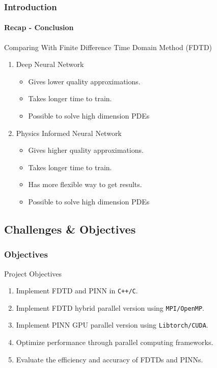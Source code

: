 \begin{frame}
  \frametitle{Introduction}
  \framesubtitle{Recap - Conclusion}
  \begin{block}{Comparing With Finite Difference Time Domain Method (FDTD)}
    \begin{enumerate}
      \item Deep Neural Network \cite{FIRST}
            \begin{itemize}
              \item Gives lower quality approximations.
              \item Takes longer time to train.
              \item Possible to solve high dimension PDEs \vspace*{1em}
            \end{itemize}
      \item Physics Informed Neural Network
            \begin{itemize}
              \item Gives higher quality approximations.
              \item Takes longer time to train.         
              \item Has more flexible way to get results.
              \item Possible to solve high dimension PDEs
            \end{itemize}
    \end{enumerate}    
  \end{block}
\end{frame}


\subsection{Challenges \& Objectives}



\begin{frame}
  \frametitle{Objectives}
  \begin{block}{Project Objectives}
    \begin{enumerate}
      \item Implement FDTD and PINN in \texttt{C++/C}.
      \item Implement FDTD hybrid parallel version using \texttt{MPI/OpenMP}.
      \item Implement PINN GPU parallel version using \texttt{Libtorch/CUDA}.
      \item Optimize performance through parallel computing frameworks.
      \item Evaluate the efficiency and accuracy of FDTDs and PINNs.
    \end{enumerate}
  \end{block}
\end{frame}


